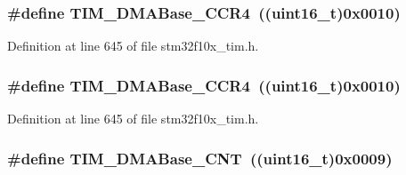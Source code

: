 \subsubsection[{\texorpdfstring{T\+I\+M\+\_\+\+D\+M\+A\+Base\+\_\+\+C\+C\+R4}{TIM_DMABase_CCR4}}]{\setlength{\rightskip}{0pt plus 5cm}\#define T\+I\+M\+\_\+\+D\+M\+A\+Base\+\_\+\+C\+C\+R4~(({\bf uint16\+\_\+t})0x0010)}\hypertarget{group___t_i_m___d_m_a___base__address_ga5e84a16e7d8ea369a3a55bb6fe1f2171}{}\label{group___t_i_m___d_m_a___base__address_ga5e84a16e7d8ea369a3a55bb6fe1f2171}


Definition at line 645 of file stm32f10x\+\_\+tim.\+h.

\subsubsection[{\texorpdfstring{T\+I\+M\+\_\+\+D\+M\+A\+Base\+\_\+\+C\+C\+R4}{TIM_DMABase_CCR4}}]{\setlength{\rightskip}{0pt plus 5cm}\#define T\+I\+M\+\_\+\+D\+M\+A\+Base\+\_\+\+C\+C\+R4~(({\bf uint16\+\_\+t})0x0010)}\hypertarget{group___t_i_m___d_m_a___base__address_ga5e84a16e7d8ea369a3a55bb6fe1f2171}{}\label{group___t_i_m___d_m_a___base__address_ga5e84a16e7d8ea369a3a55bb6fe1f2171}


Definition at line 645 of file stm32f10x\+\_\+tim.\+h.

\subsubsection[{\texorpdfstring{T\+I\+M\+\_\+\+D\+M\+A\+Base\+\_\+\+C\+NT}{TIM_DMABase_CNT}}]{\setlength{\rightskip}{0pt plus 5cm}\#define T\+I\+M\+\_\+\+D\+M\+A\+Base\+\_\+\+C\+NT~(({\bf uint16\+\_\+t})0x0009)}\hypertarget{group___t_i_m___d_m_a___base__address_gacab604257d144cf3a59b360cbc958ec9}{}\label{group___t_i_m___d_m_a___base__address_gacab604257d144cf3a59b360cbc958ec9}


